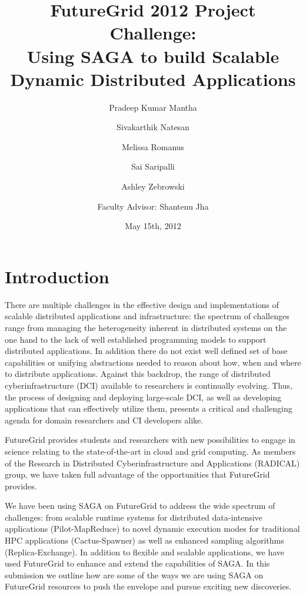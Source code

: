 \documentclass[]{paper}
\begin{document}
\title{FutureGrid 2012 Project Challenge:\\ Using SAGA to build Scalable Dynamic Distributed Applications}
\author{Pradeep Kumar Mantha 
  \and Sivakarthik Natesan 
  \and Melissa Romanus \\
  \and Sai Saripalli 
  \and Ashley Zebrowski 
  \and \large{Faculty Advisor: Shantenu Jha}\\
  }

\date{May 15th, 2012}
\maketitle

\begin{abstract}
\end{abstract}

\section{Introduction}


There are multiple challenges in the effective design and implementations of scalable distributed applications and infrastructure: the spectrum of challenges range from managing the heterogeneity inherent in distributed systems on the one hand to the lack of well established programming models to support distributed applications. In addition there do not exist well defined set of base capabilities or unifying abstractions needed to reason about how, when and where to distribute applications. Against this backdrop, the range of distributed cyberinfrastructure (DCI) available to researchers is continually evolving.  Thus, the process of designing and deploying large-scale DCI, as well as developing applications that can effectively utilize them, presents a critical and challenging agenda for domain researchers and CI developers alike.

FutureGrid provides students and researchers with new possibilities to engage in science relating to the state-of-the-art in cloud and grid computing.  As members of the Research in Distributed Cyberinfrastructure and Applications (RADICAL) group, we have taken full advantage of the opportunities that FutureGrid provides.

We have been using SAGA on FutureGrid to address the wide spectrum of challenges: from scalable runtime systems for distributed data-intensive applications (Pilot-MapReduce) to novel dynamic execution modes for traditional HPC applications (Cactus-Spawner) as well as enhanced sampling algorithms (Replica-Exchange).  In addition to flexible and scalable applications, we have used FutureGrid to enhance and extend the capabilities of SAGA.  In this submission we outline how are some of the ways we are using SAGA on FutureGrid resources to push the envelope and pursue exciting new discoveries.
\end{document}
